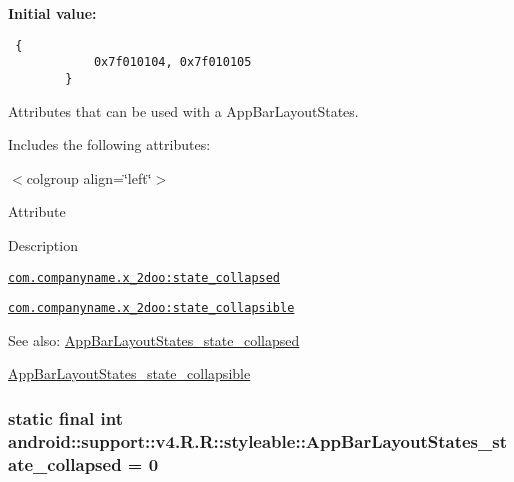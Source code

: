 \textbf{Initial value:}

\begin{Code}\begin{verbatim} {
            0x7f010104, 0x7f010105
        }
\end{verbatim}
\end{Code}
Attributes that can be used with a AppBarLayoutStates. 

Includes the following attributes: \begin{TabularC}{0}
\hline
\end{TabularC}
$<$colgroup align=\char`\"{}left\char`\"{}$>$ 

Attribute

Description 

{\tt \hyperlink{classandroid_1_1support_1_1v4_1_1_r_1_1styleable_49f2e5ab50fd3854eddcdef4b7557292}{com.companyname.x\_\-2doo:state\_\-collapsed}}

{\tt \hyperlink{classandroid_1_1support_1_1v4_1_1_r_1_1styleable_fac3d50c34559fba4e1874fb3151376d}{com.companyname.x\_\-2doo:state\_\-collapsible}}

\begin{Desc}
\item[See also:]\hyperlink{classandroid_1_1support_1_1v4_1_1_r_1_1styleable_49f2e5ab50fd3854eddcdef4b7557292}{AppBarLayoutStates\_\-state\_\-collapsed} 

\hyperlink{classandroid_1_1support_1_1v4_1_1_r_1_1styleable_fac3d50c34559fba4e1874fb3151376d}{AppBarLayoutStates\_\-state\_\-collapsible} \end{Desc}
\hypertarget{classandroid_1_1support_1_1v4_1_1_r_1_1styleable_49f2e5ab50fd3854eddcdef4b7557292}{
\subsubsection[{AppBarLayoutStates\_\-state\_\-collapsed}]{\setlength{\rightskip}{0pt plus 5cm}static final int android::support::v4.R.R::styleable::AppBarLayoutStates\_\-state\_\-collapsed = 0}}
\label{classandroid_1_1support_1_1v4_1_1_r_1_1styleable_49f2e5ab50fd3854eddcdef4b7557292}


